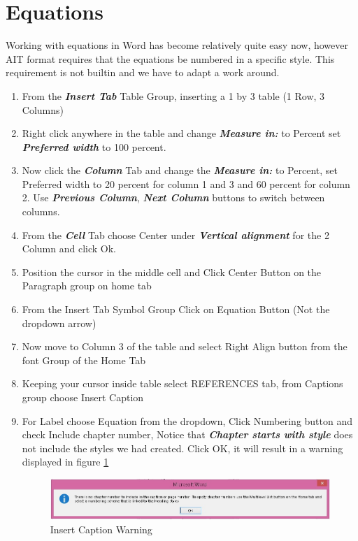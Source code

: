  \section{Equations} 
 Working with equations in Word has become relatively quite easy now, however AIT format requires that the equations be numbered in a specific style. This requirement is not builtin and we have to adapt a work around. 
 \begin{enumerate}
 \item From the \textbf{\emph{Insert Tab}} Table Group, inserting a 1 by 3 table (1 Row, 3 Columns)
 \item Right click anywhere in the table and change \textbf{\emph{Measure in:}} to Percent set \textbf{\emph{Preferred width}} to 100 percent.
 \item Now click the \textbf{\emph{Column}} Tab and change the \textbf{\emph{Measure in:}} to Percent, set Preferred width to 20 percent for column 1 and 3 and 60 percent for column 2. Use \textbf{\emph{Previous Column}}, \textbf{\emph{Next Column}} buttons to switch between columns. 
 \item From the \textbf{\emph{Cell}} Tab choose Center under \textbf{\emph{Vertical alignment}} for the 2 Column and click Ok.
 \item Position the cursor in the middle cell and Click Center Button on the Paragraph group on home tab
 \item From the Insert Tab Symbol Group Click on Equation Button (Not the dropdown arrow)
 \item Now move to Column 3 of the table and select Right Align button from the font Group of the Home Tab
 \item Keeping your cursor inside table select REFERENCES tab, from Captions group choose Insert Caption
 \item For Label choose Equation from the dropdown, Click Numbering button and check Include chapter number, Notice that \textbf{\emph{Chapter starts with style}} does not include the styles we had created. Click OK, it will result in a warning displayed in figure \ref{fig:warning}
 \begin{figure}[h]
     \centering
     \includegraphics[width=\textwidth]{./Figures/warning.jpg}
     \caption{Insert Caption Warning}
     \label{fig:warning}

\end{figure}
\end{enumerate}
